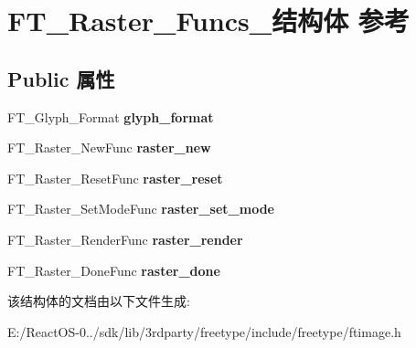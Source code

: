 \hypertarget{struct_f_t___raster___funcs__}{}\section{F\+T\+\_\+\+Raster\+\_\+\+Funcs\+\_\+结构体 参考}
\label{struct_f_t___raster___funcs__}
\subsection*{Public 属性}
\begin{DoxyCompactItemize}
\item 
\mbox{\label{struct_f_t___raster___funcs___a741b43afa16f1f1b7f633cebd9f1d6a9}} 
F\+T\+\_\+\+Glyph\+\_\+\+Format {\bfseries glyph\+\_\+format}
\item 
\mbox{\label{struct_f_t___raster___funcs___a31c9df9af6636df8a17a11bcd921b6a4}} 
F\+T\+\_\+\+Raster\+\_\+\+New\+Func {\bfseries raster\+\_\+new}
\item 
\mbox{\label{struct_f_t___raster___funcs___a91e9decd6066090a5f306f33f9815d39}} 
F\+T\+\_\+\+Raster\+\_\+\+Reset\+Func {\bfseries raster\+\_\+reset}
\item 
\mbox{\label{struct_f_t___raster___funcs___a3b37c781e54cf933cb60f57f2d45b32c}} 
F\+T\+\_\+\+Raster\+\_\+\+Set\+Mode\+Func {\bfseries raster\+\_\+set\+\_\+mode}
\item 
\mbox{\label{struct_f_t___raster___funcs___a7479a3def4522ce2667d6772e7bb96a5}} 
F\+T\+\_\+\+Raster\+\_\+\+Render\+Func {\bfseries raster\+\_\+render}
\item 
\mbox{\label{struct_f_t___raster___funcs___aecfd50bb6567d4442c997467cd68c857}} 
F\+T\+\_\+\+Raster\+\_\+\+Done\+Func {\bfseries raster\+\_\+done}
\end{DoxyCompactItemize}


该结构体的文档由以下文件生成\+:\begin{DoxyCompactItemize}
\item 
E\+:/\+React\+O\+S-\/0../sdk/lib/3rdparty/freetype/include/freetype/ftimage.\+h\end{DoxyCompactItemize}
